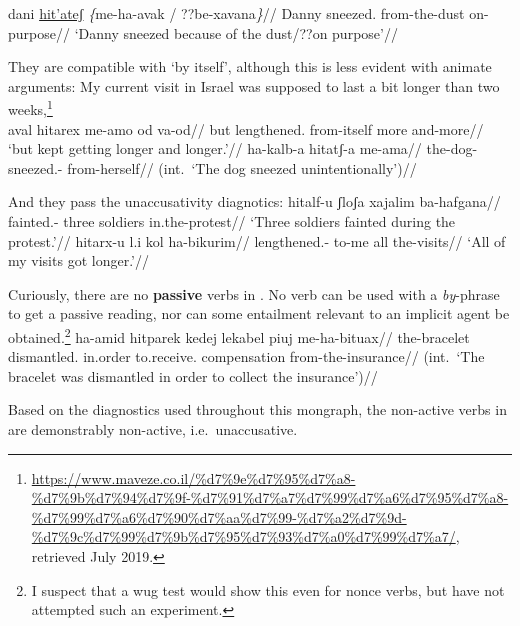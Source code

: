 \pex 
	\a \label{ex:incho1} \begingl
	\gla dani \underline{hit'ateʃ} \emph{\{}me-ha-avak / ??be-xavana\emph{\}}//
	\glb Danny sneezed. \phantom{\{}from-the-dust {} \phantom{??}on-purpose//
	\glft `Danny sneezed because of the dust/??on purpose'//
	\endgl
\xe

They are compatible with `by itself', although this is less evident with animate arguments:
\pex \label{ex:thit-inch-byitself}
	\a My current visit in Israel was supposed to last a bit longer than two weeks,\footnote{
		\url{https://www.maveze.co.il/\%d7\%9e\%d7\%95\%d7\%a8-\%d7\%9b\%d7\%94\%d7\%9f-\%d7\%91\%d7\%a7\%d7\%99\%d7\%a6\%d7\%95\%d7\%a8-\%d7\%99\%d7\%a6\%d7\%90\%d7\%aa\%d7\%99-\%d7\%a2\%d7\%9d-\%d7\%9c\%d7\%99\%d7\%9b\%d7\%95\%d7\%93\%d7\%a0\%d7\%99\%d7\%a7/}, retrieved July 2019.}\\
		\begingl
			\gla aval hitarex me-a{\ts}mo od va-od//
			\glb but lengthened. from-itself more and-more//
			\glft `but kept getting longer and longer.'//
		\endgl
	\a {}
		\begingl
			\gla ha-kalb-a hitatʃ-a me-a{\ts}ma//
			\glb the-dog- sneezed.- from-herself//
			\glft (int.~`The dog sneezed unintentionally')//
		\endgl
\xe

And they pass the unaccusativity diagnotics:
\ex
	\begingl
	\gla hitalf-u ʃloʃa xajalim ba-hafgana//
	\glb fainted.- three soldiers in.the-protest//
	\glft `Three soldiers fainted during the protest.'//
	\endgl
\xe
\ex \begingl
	\gla hitarx-u l.i kol ha-bikurim//
	\glb lengthened.- to-me all the-visits//
	\glft `All of my visits got longer.'//
	\endgl
\xe

Curiously, there are no \textbf{passive} verbs in {\thit}. No verb can be used with a \emph{by}-phrase to get a passive reading, nor can some entailment relevant to an implicit agent be obtained.\footnote{I suspect that a wug test would show this even for nonce verbs, but have not attempted such an experiment.}
\ex	\ljudge{*} \begingl
	\gla ha-{\ts}amid hitparek kedej lekabel pi{\ts}uj me-ha-bituax//
	\glb the-bracelet dismantled. in.order to.receive. compensation from-the-insurance//
	\glft (int.~`The bracelet was dismantled in order to collect the insurance')//
	\endgl
\xe

Based on the diagnostics used throughout this mongraph, the non-active verbs in {\thit} are demonstrably non-active, i.e.~unaccusative.


